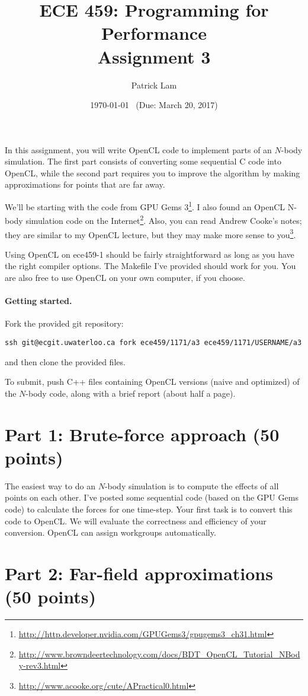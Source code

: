 \documentclass[letterpaper,10pt]{article}
\title{\bf ECE 459: Programming for Performance\\Assignment 3}
\author{Patrick Lam}
\date{\today ~ (Due: March 20, 2017)}
\begin{document}
\maketitle

In this assignment, you will write OpenCL code to implement parts of
an $N$-body simulation.  The first part consists of converting some
sequential C code into OpenCL, while the second part requires you to
improve the algorithm by making approximations for points that are far
away.

We'll be starting with the code from GPU Gems 3\footnote{\url{http://http.developer.nvidia.com/GPUGems3/gpugems3_ch31.html}}.
I also found an OpenCL N-body simulation code on the Internet\footnote{\url{http://www.browndeertechnology.com/docs/BDT_OpenCL_Tutorial_NBody-rev3.html}}. Also, you can read Andrew Cooke's notes; they are similar to my OpenCL lecture, but they may make more sense to you\footnote{\url{http://www.acooke.org/cute/APractical0.html}}.

Using OpenCL on ece459-1 should be fairly straightforward as long as
you have the right compiler options. The Makefile I've provided
should work for you. You are also free to use OpenCL on your own
computer, if you choose.

\paragraph{Getting started.} Fork the provided git repository:
\begin{center}
{\tt ssh git@ecgit.uwaterloo.ca fork ece459/1171/a3 ece459/1171/USERNAME/a3}
\end{center}
\noindent and then clone the provided files.

To submit, push C++ files containing OpenCL versions (naive and optimized) of
the $N$-body code, along with a brief report (about half a page).

\section*{Part 1: Brute-force approach (50 points)}
The easiest way to do an $N$-body simulation is to compute the effects
of all points on each other. I've posted some sequential code (based
on the GPU Gems code) to calculate the forces for one time-step. Your
first task is to convert this code to OpenCL. We will evaluate the
correctness and efficiency of your conversion. OpenCL can assign
workgroups automatically.

\section*{Part 2: Far-field approximations (50 points)}
\end{document}

